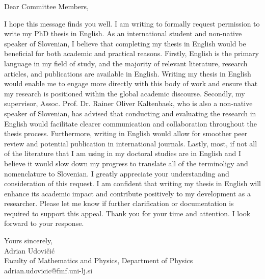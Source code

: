 \documentclass{article}
\theoremstyle{mytheoremstyle}
\theoremstyle{mytheoremstyle}
\theoremstyle{myproblemstyle}
\begin{document}
\vspace{1cm} %
Dear Committee Members,
\vspace{1cm}

I hope this message finds you well. I am writing to formally request permission to write my PhD thesis in English.
As an international student and non-native speaker of Slovenian, I believe that completing my thesis in English would be beneficial for both academic and practical reasons.
Firstly, English is the primary language in my field of study, and the majority of relevant literature, research articles, and publications are available in English.
Writing my thesis in English would enable me to engage more directly with this body of work and ensure that my research is positioned within the global academic discourse.
Secondly, my supervisor, Assoc. Prof. Dr. Rainer Oliver Kaltenbaek, who is also a non-native speaker of Slovenian, has advised that conducting and evaluating the research in 
English would facilitate clearer communication and collaboration throughout the thesis process. Furthermore, writing in English would allow for smoother peer review 
and potential publication in international journals.
Lastly, most, if not all of the literature that I am using in my doctoral studies are in English and I believe it would slow down my progress to translate
all of the terminoligy and nomenclature to Slovenian.
I greatly appreciate your understanding and consideration of this request. I am confident that writing my thesis in English will enhance its academic 
impact and contribute positively to my development as a researcher. Please let me know if further clarification or documentation is required to support this appeal.
Thank you for your time and attention. I look forward to your response.

\vspace{1cm}
Yours sincerely,\\
Adrian Udovičić\\
Faculty of Mathematics and Physics, Department of Physics\\
adrian.udovicic@fmf.uni-lj.si




\clearpage
\pagestyle{plain}
\end{document}
